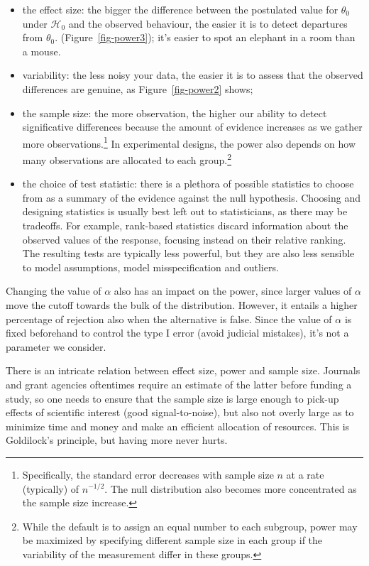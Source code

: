 \documentclass[
  11pt,
  letterpaper,
]{scrbook}
\providecommand{\tightlist}{%
  \setlength{\itemsep}{0pt}\setlength{\parskip}{0pt}}\usepackage{longtable,booktabs,array}
\theoremstyle{definition}
\theoremstyle{definition}
\theoremstyle{remark}
\begin{document}
\begin{itemize}
\tightlist
\item
  the effect size: the bigger the difference between the postulated
  value for \(\theta_0\) under \(\mathscr{H}_0\) and the observed
  behaviour, the easier it is to detect departures from \(\theta_0\).
  (Figure~\ref{fig-power3}); it's easier to spot an elephant in a room
  than a mouse.
\item
  variability: the less noisy your data, the easier it is to assess that
  the observed differences are genuine, as Figure~\ref{fig-power2}
  shows;
\item
  the sample size: the more observation, the higher our ability to
  detect significative differences because the amount of evidence
  increases as we gather more observations.\footnote{Specifically, the
    standard error decreases with sample size \(n\) at a rate
    (typically) of \(n^{-1/2}\). The null distribution also becomes more
    concentrated as the sample size increase.} In experimental designs,
  the power also depends on how many observations are allocated to each
  group.\footnote{While the default is to assign an equal number to each
    subgroup, power may be maximized by specifying different sample size
    in each group if the variability of the measurement differ in these
    groups.}
\item
  the choice of test statistic: there is a plethora of possible
  statistics to choose from as a summary of the evidence against the
  null hypothesis. Choosing and designing statistics is usually best
  left out to statisticians, as there may be tradeoffs. For example,
  rank-based statistics discard information about the observed values of
  the response, focusing instead on their relative ranking. The
  resulting tests are typically less powerful, but they are also less
  sensible to model assumptions, model misspecification and outliers.
\end{itemize}

Changing the value of \(\alpha\) also has an impact on the power, since
larger values of \(\alpha\) move the cutoff towards the bulk of the
distribution. However, it entails a higher percentage of rejection also
when the alternative is false. Since the value of \(\alpha\) is fixed
beforehand to control the type I error (avoid judicial mistakes), it's
not a parameter we consider.

There is an intricate relation between effect size, power and sample
size. Journals and grant agencies oftentimes require an estimate of the
latter before funding a study, so one needs to ensure that the sample
size is large enough to pick-up effects of scientific interest (good
signal-to-noise), but also not overly large as to minimize time and
money and make an efficient allocation of resources. This is Goldilock's
principle, but having more never hurts.
\end{document}
